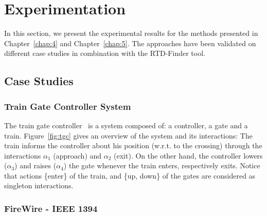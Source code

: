 \section{Experimentation}
In this section, we present the experimental results for the methods presented in 
Chapter~\ref{chap:4} and Chapter~\ref{chap:5}. The approaches have been validated on different
case studies in combination with the RTD-Finder tool.   

\subsection{Case Studies}
\subsubsection{Train Gate Controller System}

The train gate controller~\cite{AlurD94} is a system composed of: a controller, a gate and a 
train. Figure~\ref{fig:tgc} gives an overview of the system and its interactions: 
The train informs the controller about his position (w.r.t. to the crossing) through the 
interactions $\alpha_1$ (approach) and $\alpha_2$ (exit). On the other hand, the controller 
lowers ($\alpha_3$) and raises ($\alpha_4$) the gate whenever the train enters,
respectively exits. Notice that actions \{enter\} of the train, and \{up, down\} of the gates are
considered as singleton interactions.


\subsubsection{FireWire - IEEE 1394} 


